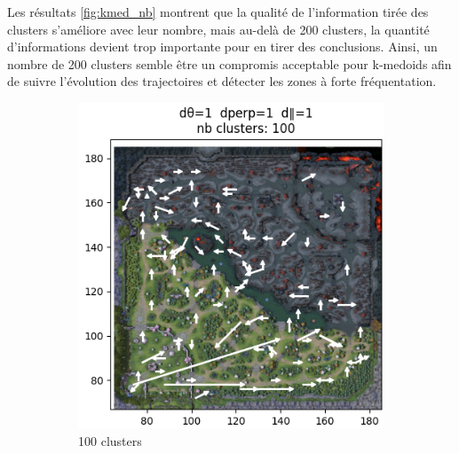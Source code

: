 Les résultats \ref{fig:kmed_nb} montrent que la qualité de l'information tirée des clusters s'améliore avec leur nombre, mais au-delà de 200 clusters, la quantité d'informations devient trop importante pour en tirer des conclusions. Ainsi, un nombre de 200 clusters semble être un compromis acceptable pour k-medoids afin de suivre l'évolution des trajectoires et détecter les zones à forte fréquentation.
\begin{figure}[h!]
     \centering
     \begin{subfigure}[b]{0.24\textwidth}
         \centering
         \includegraphics[width=\textwidth]{Images/kmedoid/kmed_100.png}
         \caption{100 clusters}
         \label{fig:kmed_100}
     \end{subfigure}
     \hfill
     \begin{subfigure}[b]{0.24\textwidth}
         \centering

\end{subfigure}
\end{figure}

